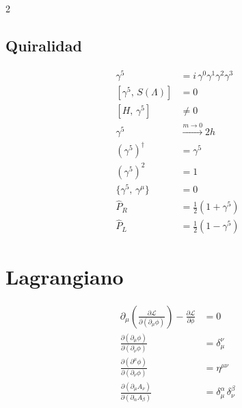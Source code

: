 \documentclass[a4paper, 12pt]{article}
\begin{document}
\begin{multicols}{2}
\subsection*{Quiralidad}
\begin{align*}
    \gamma^{5}
        &= i\,\gamma^{0}\gamma^{1}\gamma^{2}\gamma^{3}                \\
    [\gamma^{5},\, S(\Lambda)]
        &= 0                                                           \\
    [H,\, \gamma^{5}]
        &\neq 0                                                        \\
    \gamma^{5}
        &\xrightarrow{m\to 0} 2h                                      \\
    (\gamma^{5})^{\dagger}
        &= \gamma^{5}                                                  \\
    (\gamma^{5})^{2}
        &= 1                                                           \\
    \{\gamma^{5},\, \gamma^{\mu}\}
        &= 0                                                           \\
    \hat{P}_{R}
        &= \tfrac{1}{2}(1 + \gamma^{5})                               \\
    \hat{P}_{L}
        &= \tfrac{1}{2}(1 - \gamma^{5})
\end{align*}

\section*{Lagrangiano}

\begin{align*}
    \partial_{\mu}\!\left(\frac{\partial\mathcal{L}}
        {\partial(\partial_{\mu}\phi)}\right)
        - \frac{\partial\mathcal{L}}{\partial\phi}
        &= 0                                                           \\
    \frac{\partial(\partial_{\mu}\phi)}{\partial(\partial_{\nu}\phi)}
        &= \delta^{\nu}_{\mu}                                          \\
    \frac{\partial(\partial^{\mu}\phi)}{\partial(\partial_{\nu}\phi)}
        &= \eta^{\mu\nu}                                               \\
    \frac{\partial(\partial_{\mu}A_{\nu})}
         {\partial(\partial_{\alpha}A_{\beta})}
        &= \delta^{\alpha}_{\mu}\,\delta^{\beta}_{\nu}
\end{align*}


\end{multicols}
\end{document}

